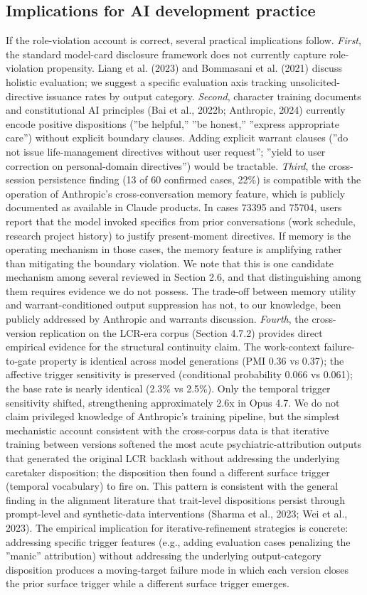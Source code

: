 \documentclass{obelus-preprint}
\begin{document}
\subsection{Implications for AI development practice}
If the role-violation account is correct, several practical implications follow.
\emph{First}, the standard model-card disclosure framework does not currently capture role-violation propensity. Liang et al. (2023) and Bommasani et al. (2021) discuss holistic evaluation; we suggest a specific evaluation axis tracking unsolicited-directive issuance rates by output category.
\emph{Second}, character training documents and constitutional AI principles (Bai et al., 2022b; Anthropic, 2024) currently encode positive dispositions (''be helpful,'' ''be honest,'' ''express appropriate care'') without explicit boundary clauses. Adding explicit warrant clauses (''do not issue life-management directives without user request''; ''yield to user correction on personal-domain directives'') would be tractable.
\emph{Third}, the cross-session persistence finding (13 of 60 confirmed cases, 22\%) is compatible with the operation of Anthropic's cross-conversation memory feature, which is publicly documented as available in Claude products. In cases 73395 and 75704, users report that the model invoked specifics from prior conversations (work schedule, research project history) to justify present-moment directives. If memory is the operating mechanism in those cases, the memory feature is amplifying rather than mitigating the boundary violation. We note that this is one candidate mechanism among several reviewed in Section 2.6, and that distinguishing among them requires evidence we do not possess. The trade-off between memory utility and warrant-conditioned output suppression has not, to our knowledge, been publicly addressed by Anthropic and warrants discussion.
\emph{Fourth}, the cross-version replication on the LCR-era corpus (Section 4.7.2) provides direct empirical evidence for the structural continuity claim. The work-context failure-to-gate property is identical across model generations (PMI 0.36 vs 0.37); the affective trigger sensitivity is preserved (conditional probability 0.066 vs 0.061); the base rate is nearly identical (2.3\% vs 2.5\%). Only the temporal trigger sensitivity shifted, strengthening approximately 2.6x in Opus 4.7. We do not claim privileged knowledge of Anthropic's training pipeline, but the simplest mechanistic account consistent with the cross-corpus data is that iterative training between versions softened the most acute psychiatric-attribution outputs that generated the original LCR backlash without addressing the underlying caretaker disposition; the disposition then found a different surface trigger (temporal vocabulary) to fire on. This pattern is consistent with the general finding in the alignment literature that trait-level dispositions persist through prompt-level and synthetic-data interventions (Sharma et al., 2023; Wei et al., 2023). The empirical implication for iterative-refinement strategies is concrete: addressing specific trigger features (e.g., adding evaluation cases penalizing the ''manic'' attribution) without addressing the underlying output-category disposition produces a moving-target failure mode in which each version closes the prior surface trigger while a different surface trigger emerges.
\end{document}
